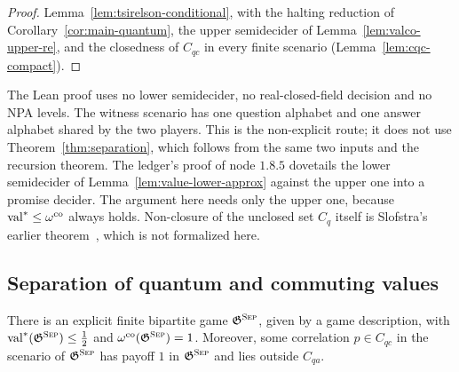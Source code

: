 \begin{proof}
\leanok
Lemma~\ref{lem:tsirelson-conditional}, with the halting reduction of
Corollary~\ref{cor:main-quantum}, the upper semidecider of Lemma~\ref{lem:valco-upper-re},
and the closedness of $C_{qc}$ in every finite scenario (Lemma~\ref{lem:cqc-compact}).
\end{proof}

The Lean proof uses no lower semidecider, no real-closed-field decision and no NPA levels. The witness scenario has one
question alphabet and one answer alphabet shared by the two players. This is the
non-explicit route; it does not use Theorem~\ref{thm:separation}, which follows from the same
two inputs and the recursion theorem. The ledger's proof of
node $1.8.5$ dovetails the lower semidecider of Lemma~\ref{lem:value-lower-approx} against
the upper one into a promise decider. The argument here needs only the upper one, because
$\mathrm{val}^* \leq \omega^{\mathrm{co}}$ always holds. Non-closure of the unclosed set $C_q$ itself is
Slofstra's earlier theorem~\cite{Slo19}, which is not formalized here.

\subsection{Separation of quantum and commuting values}

\begin{theorem}[Separation]
\label{thm:separation}
\leanok
There is an explicit finite bipartite game $\mathfrak{G}^{\textsc{Sep}}$, given by a game description, with
$\mathrm{val}^*(\mathfrak{G}^{\textsc{Sep}}) \leq \frac12$ and $\omega^{\mathrm{co}}(\mathfrak{G}^{\textsc{Sep}}) = 1$. Moreover, some
correlation $p \in C_{qc}$ in the scenario of $\mathfrak{G}^{\textsc{Sep}}$ has payoff $1$ in $\mathfrak{G}^{\textsc{Sep}}$
and lies outside $C_{qa}$.
\end{theorem}

